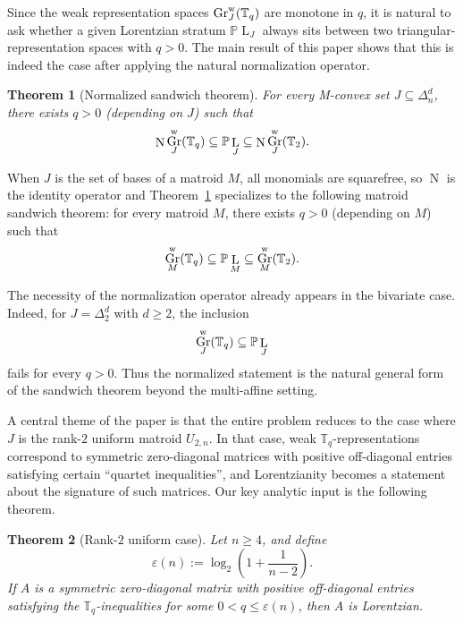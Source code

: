 \documentclass[12pt]{amsart}
\newtheorem{theorem}{Theorem}[section]
\theoremstyle{definition}
\newcommand{\1}{\mathbf{1}}
\DeclareMathOperator{\upN}{N}   %
\DeclareMathOperator{\upL}{L}   %
\DeclareMathOperator{\Gr}{Gr}
\renewcommand\P{{\mathbb P}}
\newcommand\T{{\mathbb T}}
\begin{document}
Since the weak representation spaces $\Gr_J^{\rm w}(\T_q)$ are monotone in $q$,
it is natural to ask whether a given Lorentzian stratum $\P\upL_J$ always sits
between two triangular-representation spaces with $q>0$.  The main result of this
paper shows that this is indeed the case after applying the natural normalization
operator.

\begin{theorem}[Normalized sandwich theorem]
\label{thm:intro-normalized-sandwich}
For every M-convex set $J\subseteq \Delta_n^d$, there exists $q>0$ (depending on $J$) such that
\[
\upN\Gr_J^{\rm w}(\T_q)
\subseteq
\P\upL_J
\subseteq
\upN\Gr_J^{\rm w}(\T_2).
\]
\end{theorem}

When $J$ is the set of bases of a matroid $M$, all monomials are squarefree, so
$\upN$ is the identity operator and 
Theorem~\ref{thm:intro-normalized-sandwich} specializes to the following matroid
sandwich theorem: for every matroid $M$, there exists $q>0$ (depending on $M$) such that
\[
\Gr_M^{\rm w}(\T_q)
\subseteq
\P\upL_M
\subseteq
\Gr_M^{\rm w}(\T_2).
\]

The necessity of the normalization operator already appears in the bivariate case.
Indeed, for $J=\Delta_2^d$ with $d\ge 2$, the inclusion
\[
\Gr_J^{\rm w}(\T_q)\subseteq \P\upL_J
\]
fails for every $q>0$.
Thus the normalized
statement is the natural general form of the sandwich theorem beyond the
multi-affine setting.

\medskip

A central theme of the paper is that the entire problem reduces to the case where $J$ is the rank-$2$ uniform matroid $U_{2,n}$. In that case, weak $\T_q$-representations correspond to symmetric zero-diagonal matrices with positive off-diagonal entries satisfying certain 
``quartet inequalities'', and Lorentzianity becomes a statement about the signature of such matrices. Our key analytic input is the following theorem.

\begin{theorem}[Rank-$2$ uniform case]
\label{thm:intro-U2n}
Let $n\ge 4$, and define
\[
\varepsilon(n):=\log_2\!\left(1+\frac{1}{n-2}\right).
\]
If $A$ is a symmetric zero-diagonal matrix with positive off-diagonal entries satisfying the $\T_q$-inequalities for some $0<q\le \varepsilon(n)$, then $A$ is Lorentzian. 
\end{theorem}
\end{document}
